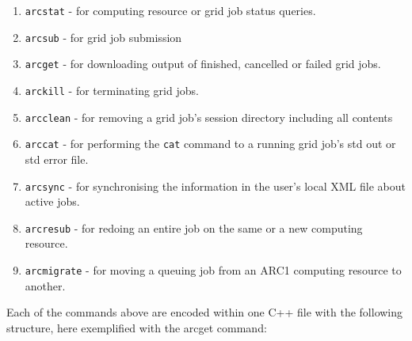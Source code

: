 \documentclass{book}
\begin{document}
\begin{enumerate}
\item{\texttt{arcstat} - for computing resource or grid job status
  queries.}
\item{\texttt{arcsub} - for grid job submission}
\item{\texttt{arcget} - for downloading output of finished, cancelled
  or failed grid jobs.}
\item{\texttt{arckill} - for terminating grid jobs.}
\item{\texttt{arcclean} - for removing a grid job's session directory
  including all contents}
\item{\texttt{arccat} - for performing the \texttt{cat} command to a
  running grid job's std out or std error file.}
\item{\texttt{arcsync} - for synchronising the information in the user's
  local XML file about active jobs.}
\item{\texttt{arcresub} - for redoing an entire job on the same or a new
  computing resource.}
\item{\texttt{arcmigrate} - for moving a queuing job from an ARC1 
  computing resource to another.}
\end{enumerate}

Each of the commands above are encoded within one C++ file with the
following structure, here exemplified with the arcget command:
\end{document}
